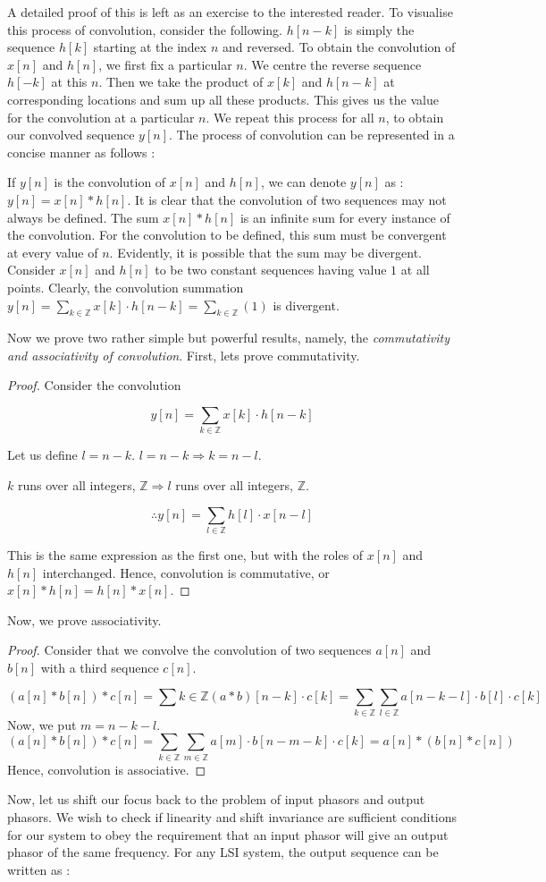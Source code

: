 \documentclass{article}
\theoremstyle{definition}
\begin{document}
A detailed proof of this is left as an exercise to the interested reader. To visualise this process of convolution, consider the following. $h[n-k]$ is simply the sequence $h[k]$ starting at the index $n$ and reversed. To obtain the convolution of $x[n]$ and $h[n]$, we first fix a particular $n$. We centre the reverse sequence $h[-k]$ at this $n$. Then we take the product of $x[k]$ and $h[n-k]$ at corresponding locations and sum up all these products. This gives us the value for the convolution at a particular $n$. We repeat this process for all $n$, to obtain our convolved sequence $y[n]$. The process of convolution can be represented in a concise manner as follows : \smallskip

If $y[n]$ is the convolution of $x[n]$ and $h[n]$, we can denote $y[n]$ as : $y[n] = x[n] * h[n]$. It is clear that the convolution of two sequences may not always be defined. The sum $x[n] * h[n]$ is an infinite sum for every instance of the convolution. For the convolution to be defined, this sum must be convergent at every value of $n$. Evidently, it is possible that the sum may be divergent. Consider $x[n]$ and $h[n]$ to be two constant sequences having value $1$ at all points. Clearly, the convolution summation $y[n] = \sum_{k \in \mathbb{Z}} x[k] \cdot h[n-k] = \sum_{k \in \mathbb{Z}} (1)$ is divergent.

Now we prove two rather simple but powerful results, namely, the \textit{commutativity and associativity of convolution}. First, lets prove commutativity.
\begin{proof}
Consider the convolution 

\[
	y[n] = \sum_{k \in \mathbb{Z}} x[k]\cdot  h[n-k]
\]

Let us define $l = n-k$. $l = n-k \Rightarrow k = n-l$.


$k$ runs over all integers, $\mathbb{Z} \Rightarrow l$ runs over all integers, $\mathbb{Z}$.

\[
	\therefore y[n] = \sum_{l \in \mathbb{Z}} h[l] \cdot x[n-l] 
\]

This is the same expression as the first one, but with the roles of $x[n]$ and $h[n]$ interchanged. 
Hence, convolution is commutative, or $x[n] * h[n] = h[n] * x[n]$.
\end{proof}
Now, we prove associativity.
\begin{proof}
Consider that we convolve the convolution of two sequences $a[n]$ and $b[n]$ with a third sequence $c[n]$. 

\[
    (a[n] * b[n]) * c[n] = \sum{k \in \mathbb{Z}} (a*b)[n-k] \cdot c[k] = \sum_{k \in \mathbb{Z}} \sum_{l \in \mathbb{Z}} a[n-k-l] \cdot b[l] \cdot c[k]
\]
Now, we put $m=n-k-l$.
\[
    (a[n] * b[n])*c[n] = \sum_{k \in \mathbb{Z}} \sum_{m \in \mathbb{Z}} a[m] \cdot b[n-m-k] \cdot c[k] = a[n]*(b[n]*c[n]) 
\]
Hence, convolution is associative.
\end{proof}
Now, let us shift our focus back to the problem of input phasors and output phasors. We wish to check if linearity and shift invariance are sufficient conditions for our system to obey the requirement that an input phasor will give an output phasor of the same frequency. For any LSI system, the output sequence can be written as : 
\end{document}

